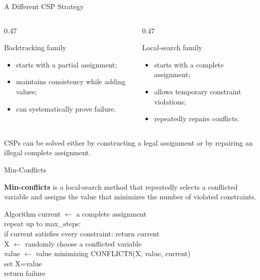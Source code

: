 \documentclass[aspectratio=169,10pt]{beamer}
\begin{document}
\begin{frame}[shrink=20]{A Different CSP Strategy}
  \begin{columns}[T,onlytextwidth]
    \begin{column}{0.47\textwidth}
      \begin{block}{Backtracking family}
        \begin{itemize}
          \item starts with a partial assignment;
          \item maintains consistency while adding values;
          \item can systematically prove failure.
        \end{itemize}
      \end{block}
    \end{column}

    \begin{column}{0.47\textwidth}
      \begin{block}{Local-search family}
        \begin{itemize}
          \item starts with a complete assignment;
          \item allows temporary constraint violations;
          \item repeatedly repairs conflicts.
        \end{itemize}
      \end{block}
    \end{column}
  \end{columns}

  \begin{keyidea}
    CSPs can be solved either by constructing a legal assignment or by repairing an illegal complete assignment.
  \end{keyidea}
\end{frame}

\begin{frame}[shrink=20]{Min-Conflicts}
  \begin{cpdefinition}
    \textbf{Min-conflicts} is a local-search method that repeatedly selects a conflicted variable and assigns the value that minimizes the number of violated constraints.
  \end{cpdefinition}

  \begin{block}{Algorithm}
  \ttfamily\small
  current $\leftarrow$ a complete assignment\\
  repeat up to max\_steps:\\
  \quad if current satisfies every constraint: return current\\
  \quad X $\leftarrow$ randomly choose a conflicted variable\\
  \quad value $\leftarrow$ value minimizing CONFLICTS(X, value, current)\\
  \quad set X=value\\
  return failure
  \end{block}
\end{frame}
\end{document}
